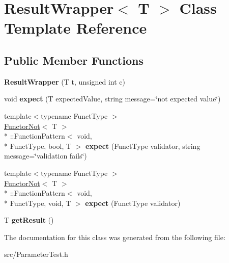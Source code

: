 \hypertarget{class_result_wrapper}{\section{Result\-Wrapper$<$ T $>$ Class Template Reference}
\label{class_result_wrapper}
}
\subsection*{Public Member Functions}
\begin{DoxyCompactItemize}
\item 
\hypertarget{class_result_wrapper_a0ec6b572fb84eb686c17de6b72f66e7a}{{\bfseries Result\-Wrapper} (T t, unsigned int c)}\label{class_result_wrapper_a0ec6b572fb84eb686c17de6b72f66e7a}

\item 
\hypertarget{class_result_wrapper_a6315300b6d3c92427368754281708a63}{void {\bfseries expect} (T expected\-Value, string message=\char`\"{}not expected value\char`\"{})}\label{class_result_wrapper_a6315300b6d3c92427368754281708a63}

\item 
\hypertarget{class_result_wrapper_a40f5c1f80bd5314183f57d8e47f4dcaf}{{\footnotesize template$<$typename Funct\-Type $>$ }\\\hyperlink{struct_functor_not}{Functor\-Not}$<$ T $>$\\*
\-::Function\-Pattern$<$ void, \\*
Funct\-Type, bool, T $>$ {\bfseries expect} (Funct\-Type validator, string message=\char`\"{}validation fails\char`\"{})}\label{class_result_wrapper_a40f5c1f80bd5314183f57d8e47f4dcaf}

\item 
\hypertarget{class_result_wrapper_a6e5c85070afd6e7f8dc9d0c745fef696}{{\footnotesize template$<$typename Funct\-Type $>$ }\\\hyperlink{struct_functor_not}{Functor\-Not}$<$ T $>$\\*
\-::Function\-Pattern$<$ void, \\*
Funct\-Type, void, T $>$ {\bfseries expect} (Funct\-Type validator)}\label{class_result_wrapper_a6e5c85070afd6e7f8dc9d0c745fef696}

\item 
\hypertarget{class_result_wrapper_a3325557a90094ce9fcffa2fb0712a0c5}{T {\bfseries get\-Result} ()}\label{class_result_wrapper_a3325557a90094ce9fcffa2fb0712a0c5}

\end{DoxyCompactItemize}


The documentation for this class was generated from the following file\-:\begin{DoxyCompactItemize}
\item 
src/Parameter\-Test.\-h\end{DoxyCompactItemize}
